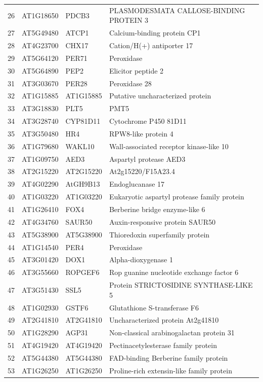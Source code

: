 \documentclass[11pt]{article}
\begin{document}
\begin{center}
\begin{tabular}{rlll}
26 & AT1G18650 & PDCB3 & PLASMODESMATA CALLOSE-BINDING PROTEIN 3\\
27 & AT5G49480 & ATCP1 & Calcium-binding protein CP1\\
28 & AT4G23700 & CHX17 & Cation/H(+) antiporter 17\\
29 & AT5G64120 & PER71 & Peroxidase\\
30 & AT5G64890 & PEP2 & Elicitor peptide 2\\
31 & AT3G03670 & PER28 & Peroxidase 28\\
32 & AT1G15885 & AT1G15885 & Putative uncharacterized protein\\
33 & AT3G18830 & PLT5 & PMT5\\
34 & AT3G28740 & CYP81D11 & Cytochrome P450 81D11\\
35 & AT3G50480 & HR4 & RPW8-like protein 4\\
36 & AT1G79680 & WAKL10 & Wall-associated receptor kinase-like 10\\
37 & AT1G09750 & AED3 & Aspartyl protease AED3\\
38 & AT2G15220 & AT2G15220 & At2g15220/F15A23.4\\
39 & AT4G02290 & AtGH9B13 & Endoglucanase 17\\
40 & AT1G03220 & AT1G03220 & Eukaryotic aspartyl protease family protein\\
41 & AT1G26410 & FOX4 & Berberine bridge enzyme-like 6\\
42 & AT4G34760 & SAUR50 & Auxin-responsive protein SAUR50\\
43 & AT5G38900 & AT5G38900 & Thioredoxin superfamily protein\\
44 & AT1G14540 & PER4 & Peroxidase\\
45 & AT3G01420 & DOX1 & Alpha-dioxygenase 1\\
46 & AT3G55660 & ROPGEF6 & Rop guanine nucleotide exchange factor 6\\
47 & AT3G51430 & SSL5 & Protein STRICTOSIDINE SYNTHASE-LIKE 5\\
48 & AT1G02930 & GSTF6 & Glutathione S-transferase F6\\
49 & AT2G41810 & AT2G41810 & Uncharacterized protein At2g41810\\
50 & AT1G28290 & AGP31 & Non-classical arabinogalactan protein 31\\
51 & AT4G19420 & AT4G19420 & Pectinacetylesterase family protein\\
52 & AT5G44380 & AT5G44380 & FAD-binding Berberine family protein\\
53 & AT1G26250 & AT1G26250 & Proline-rich extensin-like family protein\\

\end{tabular}
\end{center}
\end{document}
